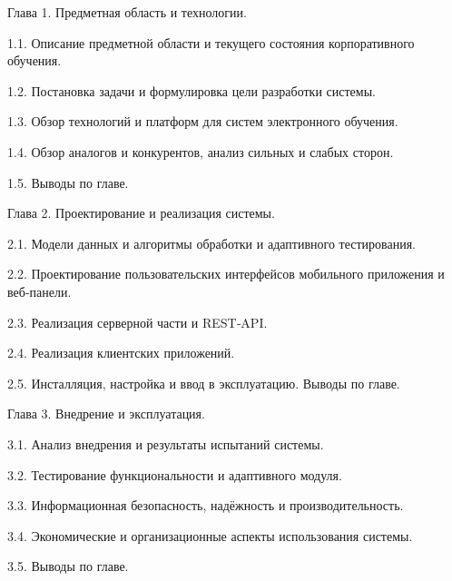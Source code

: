 \documentclass{G7-32}
\begin{document}
Глава 1. Предметная область и технологии.

1.1. Описание предметной области и текущего состояния корпоративного обучения.  

1.2. Постановка задачи и формулировка цели разработки системы.  

1.3. Обзор технологий и платформ для систем электронного обучения.  

1.4. Обзор аналогов и конкурентов, анализ сильных и слабых сторон.  

1.5. Выводы по главе.

Глава 2. Проектирование и реализация системы.

2.1. Модели данных и алгоритмы обработки и адаптивного тестирования.  

2.2. Проектирование пользовательских интерфейсов мобильного приложения и веб‑панели.  

2.3. Реализация серверной части и REST‑API.  

2.4. Реализация клиентских приложений.  

2.5. Инсталляция, настройка и ввод в эксплуатацию. Выводы по главе.

Глава 3. Внедрение и эксплуатация.

3.1. Анализ внедрения и результаты испытаний системы.  

3.2. Тестирование функциональности и адаптивного модуля.  

3.3. Информационная безопасность, надёжность и производительность.  

3.4. Экономические и организационные аспекты использования системы.  

3.5. Выводы по главе.
\end{document}
